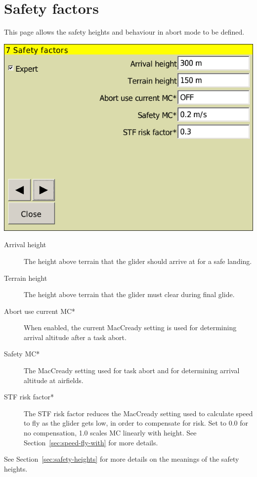 \documentclass[a4paper,12pt]{refrep}
\begin{document}
\section{Safety factors}

This page allows the safety heights and behaviour in abort mode to be defined.

\begin{center}
\includegraphics[angle=0,width=\linewidth,keepaspectratio='true']{figures/config-safety.png}
\end{center}

\begin{description}
\item[Arrival height]  The height above terrain that the glider
  should arrive at for a safe landing.
\item[Terrain height] The height above terrain that the glider must
  clear during final glide.
\item[Abort use current MC*]  When enabled, the current MacCready setting
  is used for determining arrival altitude after a task abort.
\item[Safety MC*]  The MacCready setting used for task abort and
  for determining arrival altitude at airfields. 
\item[STF risk factor*] 
  The STF risk factor reduces the MacCready setting used to calculate
  speed to fly as the glider gets low, in order to compensate for
  risk.  Set to 0.0 for no compensation, 1.0 scales MC linearly with
  height.  See Section~\ref{sec:speed-fly-with} for more details.
\end{description}
See Section~\ref{sec:safety-heights} for more details on the meanings
of the safety heights.
\end{document}
